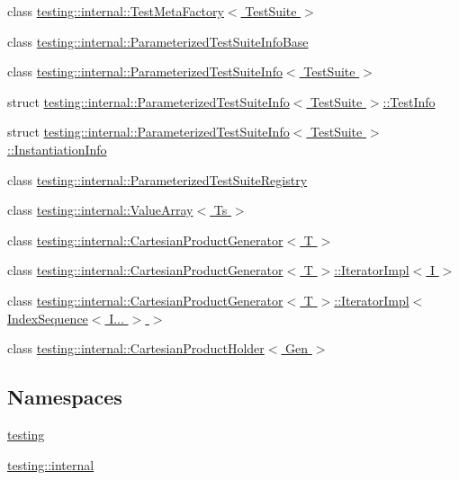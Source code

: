 \begin{DoxyCompactItemize}
\item 
class \hyperlink{classtesting_1_1internal_1_1TestMetaFactory}{testing\+::internal\+::\+Test\+Meta\+Factory$<$ Test\+Suite $>$}
\item 
class \hyperlink{classtesting_1_1internal_1_1ParameterizedTestSuiteInfoBase}{testing\+::internal\+::\+Parameterized\+Test\+Suite\+Info\+Base}
\item 
class \hyperlink{classtesting_1_1internal_1_1ParameterizedTestSuiteInfo}{testing\+::internal\+::\+Parameterized\+Test\+Suite\+Info$<$ Test\+Suite $>$}
\item 
struct \hyperlink{structtesting_1_1internal_1_1ParameterizedTestSuiteInfo_1_1TestInfo}{testing\+::internal\+::\+Parameterized\+Test\+Suite\+Info$<$ Test\+Suite $>$\+::\+Test\+Info}
\item 
struct \hyperlink{structtesting_1_1internal_1_1ParameterizedTestSuiteInfo_1_1InstantiationInfo}{testing\+::internal\+::\+Parameterized\+Test\+Suite\+Info$<$ Test\+Suite $>$\+::\+Instantiation\+Info}
\item 
class \hyperlink{classtesting_1_1internal_1_1ParameterizedTestSuiteRegistry}{testing\+::internal\+::\+Parameterized\+Test\+Suite\+Registry}
\item 
class \hyperlink{classtesting_1_1internal_1_1ValueArray}{testing\+::internal\+::\+Value\+Array$<$ Ts $>$}
\item 
class \hyperlink{classtesting_1_1internal_1_1CartesianProductGenerator}{testing\+::internal\+::\+Cartesian\+Product\+Generator$<$ T $>$}
\item 
class \hyperlink{classtesting_1_1internal_1_1CartesianProductGenerator_1_1IteratorImpl}{testing\+::internal\+::\+Cartesian\+Product\+Generator$<$ T $>$\+::\+Iterator\+Impl$<$ I $>$}
\item 
class \hyperlink{classtesting_1_1internal_1_1CartesianProductGenerator_1_1IteratorImpl_3_01IndexSequence_3_01I_8_8_8_01_4_01_4}{testing\+::internal\+::\+Cartesian\+Product\+Generator$<$ T $>$\+::\+Iterator\+Impl$<$ Index\+Sequence$<$ I... $>$ $>$}
\item 
class \hyperlink{classtesting_1_1internal_1_1CartesianProductHolder}{testing\+::internal\+::\+Cartesian\+Product\+Holder$<$ Gen $>$}
\end{DoxyCompactItemize}
\subsection*{Namespaces}
\begin{DoxyCompactItemize}
\item 
 \hyperlink{namespacetesting}{testing}
\item 
 \hyperlink{namespacetesting_1_1internal}{testing\+::internal}
\end{DoxyCompactItemize}
